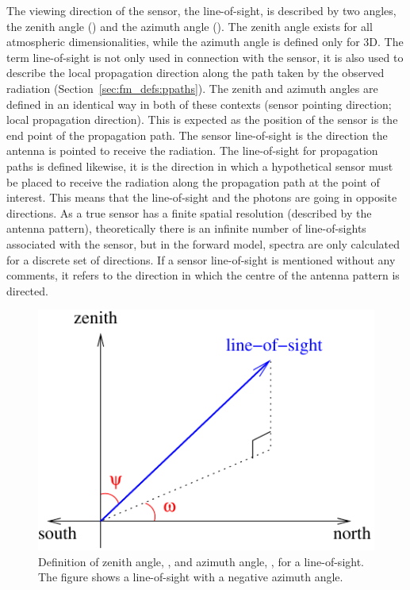 The viewing direction of the sensor, the line-of-sight, is described
by two angles, the zenith angle (\ZntAng) and the azimuth angle
(\AzmAng). The zenith angle exists for all atmospheric
dimensionalities, while the azimuth angle is defined only for 3D.
The term line-of-sight is not only used in connection with the sensor,
it is also used to describe the local propagation direction along the
path taken by the observed radiation
(Section~\ref{sec:fm_defs:ppaths}).  The zenith and azimuth angles
are defined in an identical way in both of these contexts (sensor
pointing direction; local propagation direction). This is expected as
the position of the sensor is the end point of the propagation path.
The sensor line-of-sight is the direction the antenna is pointed to
receive the radiation. The line-of-sight for propagation paths is
defined likewise, it is the direction in which a hypothetical sensor
must be placed to receive the radiation along the propagation path at
the point of interest. This means that the line-of-sight and the
photons are going in opposite directions. As a true sensor has a
finite spatial resolution (described by the antenna pattern),
theoretically there is an infinite number of line-of-sights associated
with the sensor, but in the forward model, spectra are only calculated
for a discrete set of directions. If a sensor line-of-sight is
mentioned without any comments, it refers to the direction in which
the centre of the antenna pattern is directed.

\begin{figure}
 \begin{center}
  \begin{minipage}[c]{0.6\textwidth}
   \includegraphics*[width=0.99\hsize]{za_and_aa_angles}
  \end{minipage}%
  \begin{minipage}[c]{0.4\textwidth}
   \caption{Definition of zenith angle, \ZntAng, and azimuth angle, 
       \AzmAng, for a line-of-sight. The figure shows a line-of-sight
       with a negative azimuth angle.}
   \label{fig:fm_defs:los}
  \end{minipage}
 \end{center}
\end{figure}           
 
